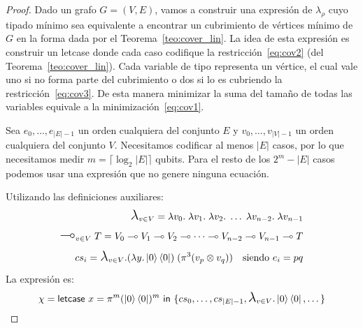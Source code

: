 \begin{proof}
    Dado un grafo $G=(V,E)$, vamos a construir una expresión de $\lambda_\rho$ cuyo tipado mínimo sea equivalente a encontrar un cubrimiento de vértices mínimo de $G$ en la forma dada por el Teorema~\ref{teo:cover_lin}. La idea de esta expresión es construir un \textsf{letcase} donde cada caso codifique la restricción~\ref{eq:cov2} (del Teorema~\ref{teo:cover_lin}). Cada variable de tipo representa un vértice, el cual vale uno si no forma parte del cubrimiento o dos si lo es cubriendo la restricción~\ref{eq:cov3}. De esta manera minimizar la suma del tamaño de todas las variables equivale a la minimización~\ref{eq:cov1}.

    Sea $e_0, \dots, e_{|E|-1}$ un orden cualquiera del conjunto $E$ y $v_0, \dots, v_{|V|-1}$ un orden cualquiera del conjunto $V$. Necesitamos codificar al menos $|E|$ casos, por lo que necesitamos medir $m=\lceil\log_2|E|\rceil$ qubits. Para el resto de los $2^m-|E|$ casos podemos usar una expresión que no genere ninguna ecuación.

    Utilizando las definiciones auxiliares:
    \begin{align*}
        \biglambda_{v\in V}  =\lambda v_0.\;\lambda v_1.\;\lambda v_2.\; \dots \;\lambda v_{n-2}.\;\lambda v_{n-1}\\
        \bigmultimap_{v\in V}\;T = V_0\multimap V_1 \multimap V_2\multimap \dots\multimap V_{n-2}\multimap V_{n-1} \multimap T\\
        cs_i= \biglambda_{v\in V}.(\lambda y. \ket{0}\bra{0})\;(\pi^3 (v_p\otimes v_q)) \quad\text{siendo } e_i = pq
    \end{align*}
    La expresión es:
    \begin{align}\label{eq:chi}
        \chi = \textsf{letcase } x = \pi^m (\ket{0}\bra{0})^m\textsf{ in }\{cs_0, \dots, cs_{|E|-1}, \biglambda_{v\in V}.\ket{0}\bra{0}, \dots\}
    \end{align}


\end{proof}
